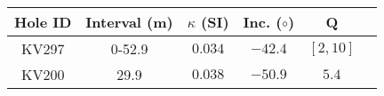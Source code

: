 \documentclass[paper]{geophysics}
\begin{document}
\begin{table}
\begin{tabular}{|c|c|c|c|c|c|}
\hline
Hole ID & Interval (m) & $\kappa$ (SI) & Inc. ($\circ$) & Q\\
\hline
KV297 & 0-52.9 & $0.034$ & $-42.4$&$[2, 10] $\\
\hline
KV200 & 29.9 & $0.038$ & $-50.9$&$ 5.4$\\
\hline
\end{tabular}
\label{MagCoreSamples}
\end{table}
\end{document}
